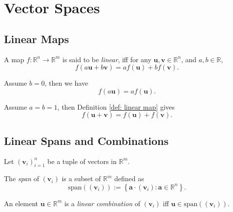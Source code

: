 
\chapter{Vector Spaces}


\section{Linear Maps}



\begin{definition}
	\label{def: linear map}	
	A map $f: \mathbb R^n \to \mathbb R^m$ is said to be \textit{linear}, iff for any $\mathbf u, \mathbf v \in \mathbb R^n$, and $a, b \in \mathbb R$,
	$$
	f(a\mathbf u + b\mathbf v) = a f(\mathbf u) + b f(\mathbf v).
	$$
\end{definition}



\begin{note}
	Assume $b = 0$, then we have
	$$
	f(a\mathbf u) = a f(\mathbf u).
	$$

	Assume $a = b = 1$, then Definition \ref{def: linear map} gives
	$$
	f(\mathbf u + \mathbf v) = f(\mathbf u) + f(\mathbf v).
	$$	
\end{note}





\section{Linear Spans and Combinations}


\begin{definition}
	\label{def: span and combination}	
	Let $(\mathbf v_i)_{i = 1}^n$ be a tuple of vectors in $\mathbb R^m$.
	
	The \textit{span} of $(\mathbf v_i)$ is a subset of $\mathbb R^m$ defined as
	$$
	\mathrm{span}((\mathbf v_i)) := \left\{ \mathbf a \cdot (\mathbf v_i) : \mathbf a \in \mathbb R^n \right\}.
	$$
	
	An element $\mathbf u \in \mathbb R^m$ is a \textit{linear combination} of $(\mathbf v_i)$ iff $\mathbf u \in \mathrm{span}((\mathbf v_i))$.
\end{definition}


